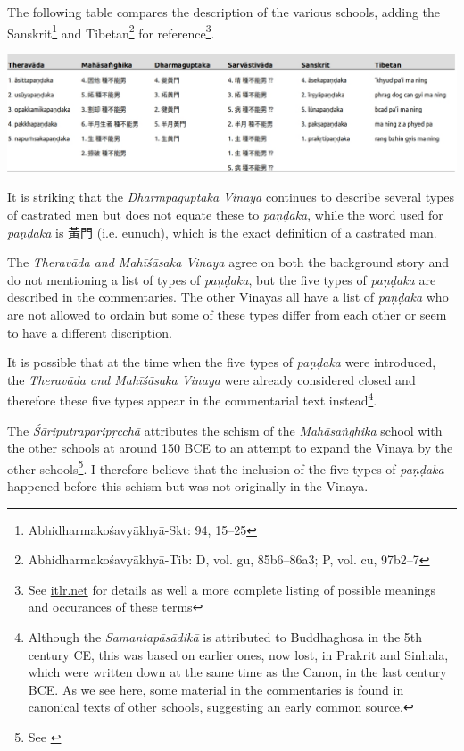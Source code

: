 The following table compares the description of the various schools, adding the Sanskrit\footnote{Abhidharmakośavyākhyā-Skt: 94, 15–25} and Tibetan\footnote{Abhidharmakośavyākhyā-Tib: D, vol. gu, 85b6–86a3; P, vol. cu, 97b2–7} for reference\footnote{See \href{http://www.itlr.net/hwid:281142}{itlr.net} for details as well a more complete listing of possible meanings and occurances of these terms}.

\includegraphics[width=\linewidth]{pandaka.jpg}
\label{pandaka}

It is striking that the {\em Dharmpaguptaka Vinaya} continues to describe several types of castrated men but does not equate these to {\em paṇḍaka}, while the word used for {\em paṇḍaka} is 黃門 (i.e. eunuch), which is the exact definition of a castrated man.

The {\em Theravāda and Mahīśāsaka Vinaya} agree on both the background story and do not mentioning a list of types of {\em paṇḍaka}, but the five types of {\em paṇḍaka} are described in the commentaries. The other Vinayas all have a list of {\em paṇḍaka} who are not allowed to ordain but some of these types differ from each other or seem to have a different discription.

It is possible that at the time when the five types of {\em paṇḍaka} were introduced, the {\em Theravāda and Mahīśāsaka Vinaya} were already considered closed and therefore these five types appear in the commentarial text instead\footnote{Although the {\em Samantapāsādikā} is attributed to Buddhaghosa in the 5th century CE, this was based on earlier ones, now lost, in Prakrit and Sinhala, which were written down at the same time as the Canon, in the last century BCE. As we see here, some material in the commentaries is found in canonical texts of other schools, suggesting an early common source.}. 

The {\em Śāriputraparipṛcchā} attributes the schism of the {\em Mahāsaṅghika} school with the other schools at around 150 BCE to an attempt to expand the Vinaya by the other schools\footnote{See \cite{sujato2012}}. I therefore believe that the inclusion of the five types of {\em paṇḍaka} happened before this schism but was not originally in the Vinaya.

